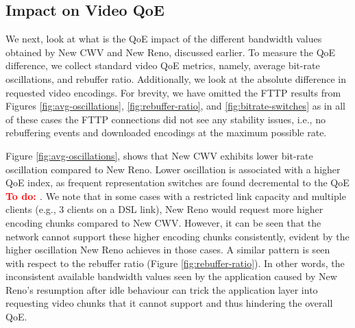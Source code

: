 \documentclass[10pt,sigconf]{acmart}
\newcommand{\todo}[1]{\textbf{\textcolor{red}{To do: #1}}}
\begin{document}





\subsection{Impact on Video QoE}

We next, look at what is the QoE impact of the different bandwidth values obtained by New CWV and New Reno, discussed earlier. To measure the QoE difference, we collect standard video QoE metrics, namely, average bit-rate oscillations, and rebuffer ratio. Additionally, we look at the absolute difference in requested video encodings. For brevity, we have omitted the FTTP results from Figures \ref{fig:avg-oscillations}, \ref{fig:rebuffer-ratio}, and \ref{fig:bitrate-switches} as in all of these cases the FTTP connections did not see any stability issues, i.e., no rebuffering events and downloaded encodings at the maximum possible rate.

Figure \ref{fig:avg-oscillations}, shows that New CWV exhibits lower bit-rate oscillation compared to New Reno. Lower oscillation is associated with a higher QoE index, as frequent representation switches are found decremental to the QoE \todo{\cite{}}. We note that in some cases with a restricted link capacity and multiple clients (e.g., 3 clients on a DSL link), New Reno would request more higher encoding chunks compared to New CWV. However, it can be seen that the network cannot support these higher encoding chunks consistently, evident by the higher oscillation New Reno achieves in those cases. A similar pattern is seen with respect to the rebuffer ratio (Figure \ref{fig:rebuffer-ratio}). In other words, the inconsistent available bandwidth values seen by the application caused by New Reno's resumption after idle behaviour can trick the application layer into requesting video chunks that it cannot support and thus hindering the overall QoE.
\end{document}
